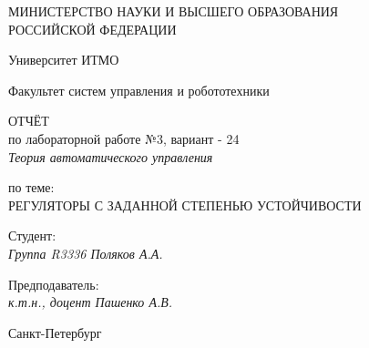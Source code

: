 \thispagestyle{empty}

\begin{center}
    МИНИСТЕРСТВО НАУКИ И ВЫСШЕГО ОБРАЗОВАНИЯ \\ РОССИЙСКОЙ ФЕДЕРАЦИИ

    \vspace{20pt}

    Университет ИТМО

    \vspace{20pt}

    Факультет систем управления и робототехники
\end{center}

\vfill

\begin{center}
    ОТЧЁТ \\  
    по лабораторной работе  №3, вариант - 24 \\
    \vspace{10pt}
    \textit{Теория автоматического управления}

    \vspace{20pt}

    по теме: \\
    \uppercase{Регуляторы с заданной степенью устойчивости}
\end{center}

\vfill

\noindent Студент: \\
\textit{Группа R3336 \hfill Поляков А.А.}


    \vspace{20pt}

    \noindent Предподаватель: \\
    \textit{к.т.н., доцент \hfill  Пашенко А.В.}

\vfill

\begin{center}
    Санкт-Петербург \\ \the\year
\end{center}